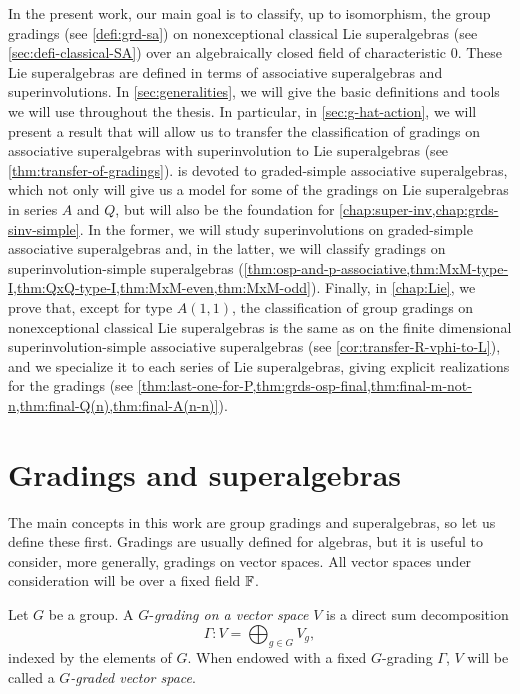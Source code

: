 In the present work, our main goal is to classify, up to isomorphism, the group gradings (see \cref{defi:grd-sa}) on nonexceptional classical Lie superalgebras (see \cref{sec:defi-classical-SA}) over an algebraically closed field of characteristic $0$. 
These Lie superalgebras are defined in terms of associative superalgebras and  superinvolutions. 
In \cref{sec:generalities}, we will give the basic definitions and tools we will use throughout the thesis. 
In particular, in \cref{sec:g-hat-action}, we will present a result that will allow us to transfer the classification of gradings on associative superalgebras with superinvolution to Lie superalgebras (see \cref{thm:transfer-of-gradings}). 
 is devoted to graded-simple associative superalgebras, which not only will give us a model for some of the gradings on Lie superalgebras in series $A$ and $Q$, but will also be the foundation for \cref{chap:super-inv,chap:grds-sinv-simple}. 
In the former, we will study superinvolutions on graded-simple associative superalgebras and, in the latter, we will classify gradings on superinvolution-simple superalgebras (\cref{thm:osp-and-p-associative,thm:MxM-type-I,thm:QxQ-type-I,thm:MxM-even,thm:MxM-odd}).  
Finally, in \cref{chap:Lie}, we prove that, except for type $A(1,1)$, the classification of group gradings on nonexceptional classical Lie superalgebras is the same as on the finite dimensional superinvolution-simple associative superalgebras (see \cref{cor:transfer-R-vphi-to-L}), and we specialize it to each series of Lie superalgebras, giving explicit realizations for the gradings (see \cref{thm:last-one-for-P,thm:grds-osp-final,thm:final-m-not-n,thm:final-Q(n),thm:final-A(n-n)}).


\section{Gradings and superalgebras}\label{sec:grds-and-sa}

The main concepts in this work are group gradings and superalgebras, so let us define these first.
Gradings are usually defined for algebras, but it is useful to consider, more generally, gradings on vector spaces. 
All vector spaces under consideration will be over a fixed field $\mathbb{F}$. 

\begin{defi}\label{defi:grading}
    Let $G$ be a group. 
	A $G$-\emph{grading on a vector space} $V$ is a direct sum decomposition
	\[\label{eq:grading}
	    \Gamma : V= \bigoplus_{g \in G} V_g,
	\]
	indexed by the elements of $G$.
	When endowed with a fixed $G$-grading $\Gamma$, $V$ will be called a \emph{$G$-graded vector space}. 
\end{defi}

